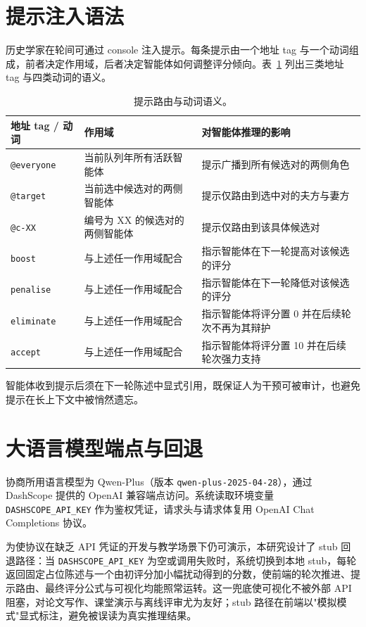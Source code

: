 \section{提示注入语法}\label{sec:mas-hint}

历史学家在轮间可通过 console 注入提示。每条提示由一个地址 tag 与一个动词组成，前者决定作用域，后者决定智能体如何调整评分倾向。表~\ref{tab:hint-routing} 列出三类地址 tag 与四类动词的语义。

\begin{table}[h]
\centering
\caption{提示路由与动词语义。}\label{tab:hint-routing}
\footnotesize
\begin{tabular}{@{}lll@{}}
\toprule
地址 tag / 动词 & 作用域 & 对智能体推理的影响 \\
\midrule
\texttt{@everyone} & 当前队列年所有活跃智能体 & 提示广播到所有候选对的两侧角色 \\
\texttt{@target} & 当前选中候选对的两侧智能体 & 提示仅路由到选中对的夫方与妻方 \\
\texttt{@c-XX} & 编号为 XX 的候选对的两侧智能体 & 提示仅路由到该具体候选对 \\
\midrule
\texttt{boost} & 与上述任一作用域配合 & 指示智能体在下一轮提高对该候选的评分 \\
\texttt{penalise} & 与上述任一作用域配合 & 指示智能体在下一轮降低对该候选的评分 \\
\texttt{eliminate} & 与上述任一作用域配合 & 指示智能体将评分置 0 并在后续轮次不再为其辩护 \\
\texttt{accept} & 与上述任一作用域配合 & 指示智能体将评分置 10 并在后续轮次强力支持 \\
\bottomrule
\end{tabular}
\end{table}

智能体收到提示后须在下一轮陈述中显式引用，既保证人为干预可被审计，也避免提示在长上下文中被悄然遗忘。

\section{大语言模型端点与回退}\label{sec:mas-llm}

协商所用语言模型为 Qwen-Plus（版本 \texttt{qwen-plus-2025-04-28}），通过 DashScope 提供的 OpenAI 兼容端点访问。系统读取环境变量 \texttt{DASHSCOPE\_API\_KEY} 作为鉴权凭证，请求头与请求体复用 OpenAI Chat Completions 协议。

为使协议在缺乏 API 凭证的开发与教学场景下仍可演示，本研究设计了 stub 回退路径：当 \texttt{DASHSCOPE\_API\_KEY} 为空或调用失败时，系统切换到本地 stub，每轮返回固定占位陈述与一个由初评分加小幅扰动得到的分数，使前端的轮次推进、提示路由、最终评分公式与可视化均能照常运转。这一兜底使可视化不被外部 API 阻塞，对论文写作、课堂演示与离线评审尤为友好；stub 路径在前端以"模拟模式"显式标注，避免被误读为真实推理结果。
